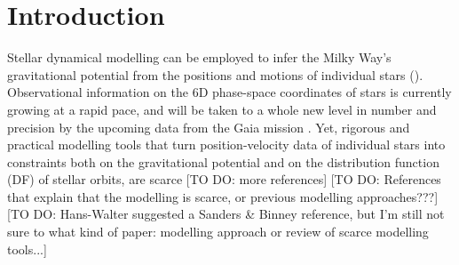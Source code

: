 \section{Introduction} \label{sec:intro}

Stellar dynamical modelling can be employed to infer the Milky Way's gravitational potential from the positions and motions of individual stars (\citealt{2008gady.book.....B,2011Prama..77...39B,rix13}). Observational information on the 6D phase-space coordinates of stars is currently growing at a rapid pace, and will be taken to a whole new level in number and precision by the upcoming data from the Gaia mission \citep{2001A&A...369..339P}. Yet, rigorous and practical modelling tools that turn position-velocity data of individual stars into constraints both on the gravitational potential and on the distribution function (DF) of stellar orbits, are scarce \citep{rix13} [TO DO: more references] [TO DO: References that explain that the modelling is scarce, or previous modelling approaches???] [TO DO: Hans-Walter suggested a Sanders \& Binney reference, but I'm still not sure to what kind of paper: modelling approach or review of scarce modelling tools...]\\







